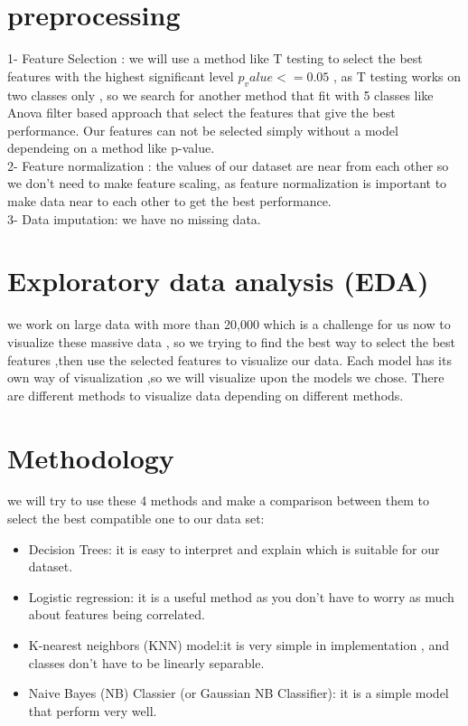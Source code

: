 \documentclass[10pt,twocolumn,letterpaper]{article}
\begin{document}
\section{preprocessing}


1- Feature Selection : we will use a method like T testing to select the best features with the highest significant level $p_value<= 0.05$ , as T testing works on two classes only , so we search for another method that fit with 5 classes like Anova filter based approach that select the features that give the best performance. 
Our features can not be selected simply without a model dependeing on a method like p-value.\\
2- Feature normalization : the values of our dataset are near from each other so we don't need to make feature scaling, as feature normalization is important to make data near to each other to get the best performance.\\
3- Data imputation: we have no missing data.\\

\section{Exploratory data analysis (EDA)}


we work on large data with more than 20,000 which is a challenge for us now to visualize these massive data , so we trying to find the best way to select the best features ,then use the selected features to visualize our data.
Each model has its own way of visualization ,so we will visualize upon the models we chose.
There are different methods to visualize data depending on different methods.

\section{Methodology}


we will try to use these 4  methods  and make a comparison  between them to select the best compatible one to our data set:
\begin{itemize}
	\item Decision Trees: it is easy to interpret and explain which is suitable for our dataset.
	\item Logistic regression: it is a useful method as you don't have to worry as much about features being correlated. 
	\item K-nearest neighbors (KNN) model:it is very simple in implementation , and classes don't have to be linearly separable.	
	\item Naive Bayes (NB) Classier (or Gaussian NB Classifier): it is a simple model that perform very well.
\end{itemize}
\end{document}
